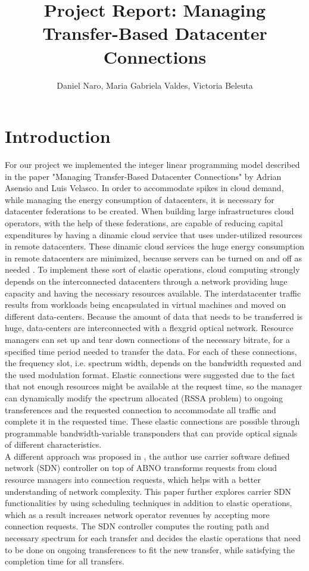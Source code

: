 \documentclass[11pt,a4paper]{article}
\title{Project Report: Managing Transfer-Based Datacenter Connections}
\author{Daniel Naro, Maria Gabriela Valdes, Victoria Beleuta}
\begin{document}
\maketitle
\section{Introduction}

For our project we implemented the integer linear programming model described in the paper "Managing Transfer-Based Datacenter Connections" by Adrian Asensio and Luis Velasco. In order to accommodate spikes in cloud demand, while managing the energy consumption of datacenters, it is necessary for datacenter federations to be created. When building large infrastructures cloud operators, with the help of these federations, are capable of reducing capital expenditures by having a dinamic cloud service that uses under-utilized resources in remote datacenters. These dinamic cloud services the huge energy consumption in remote datacenters are minimized, because servers can be turned on and off as needed . To implement these sort of elastic operations, cloud computing strongly depends on the interconnected datacenters through a network providing huge capacity and having the necessary resources available. The interdatacenter traffic results from workloads being encapsulated in virtual machines and moved on different data-centers. Because the amount of data that needs to be transferred is huge, data-centers are interconnected with a flexgrid optical network. Resource managers can set up and tear down connections of the necessary bitrate, for a specified time period needed to transfer the data. For each of these connections, the frequency slot, i.e. spectrum width, depends on the bandwidth requested and the used modulation format. Elastic connections were suggested due to the fact that not enough resources might be available at the request time, so the manager can dynamically modify the spectrum allocated (RSSA problem)  to ongoing transferences and the requested connection to accommodate all traffic and complete it in the requested time. These elastic connections are possible through programmable bandwidth-variable transponders that can provide optical signals of different characteristics.\\

A different approach was proposed in \cite{1}, the author use carrier software defined network (SDN) controller on top of ABNO transforms requests from cloud resource managers into connection requests, which helps with a better understanding of network complexity. This paper further explores carrier SDN functionalities by using scheduling techniques in addition to elastic operations, which as a result increases network operator revenues by accepting more connection requests. The SDN controller computes the routing path and necessary spectrum for each transfer and decides the elastic operations that need to be done on ongoing transferences to fit the new transfer, while satisfying the completion time for all transfers.\\
\end{document}
